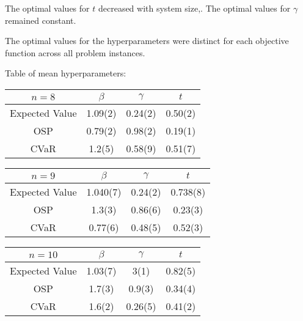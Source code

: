 The optimal values for $t$ decreased with system size,. The optimal values for $\gamma$ remained constant. 

The optimal values for the hyperparameters were distinct for each objective function across all problem instances.

Table of mean hyperparameters:

\begin{tabular}{c||c|c|c}
    $n=8$          & $\beta$ & $\gamma$ & $t$     \\\hline\hline
    Expected Value & 1.09(2) & 0.24(2)  & 0.50(2) \\\hline
    OSP            & 0.79(2) & 0.98(2)  & 0.19(1) \\\hline
    CVaR           & 1.2(5)  & 0.58(9)  & 0.51(7) 
\end{tabular}

\begin{tabular}{c||c|c|c}
    $n=9$          & $\beta$ & $\gamma$ & $t$      \\\hline\hline
    Expected Value & 1.040(7)& 0.24(2)  & 0.738(8) \\\hline
    OSP            & 1.3(3)  & 0.86(6)  & 0.23(3)  \\\hline
    CVaR           & 0.77(6) & 0.48(5)  & 0.52(3) 
\end{tabular}

\begin{tabular}{c||c|c|c}
    $n=10$         & $\beta$ & $\gamma$ & $t$     \\\hline\hline
    Expected Value & 1.03(7) & 3(1)     & 0.82(5) \\\hline
    OSP            & 1.7(3)  & 0.9(3)   & 0.34(4) \\\hline
    CVaR           & 1.6(2)  & 0.26(5)  & 0.41(2)
\end{tabular}
